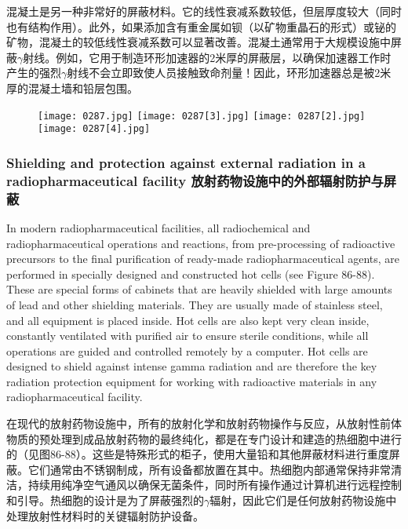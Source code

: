 \documentclass[dvipsnames, svgnames,a4paper,11pt]{article}
\begin{document}
混凝土是另一种非常好的屏蔽材料。它的线性衰减系数较低，但层厚度较大（同时也有结构作用）。此外，如果添加含有重金属如钡（以矿物重晶石的形式）或铋的矿物，混凝土的较低线性衰减系数可以显著改善。混凝土通常用于大规模设施中屏蔽$\gamma$射线。例如，它用于制造环形加速器的2米厚的屏蔽层，以确保加速器工作时产生的强烈$\gamma$射线不会立即致使人员接触致命剂量！因此，环形加速器总是被2米厚的混凝土墙和铅层包围。

\begin{figure}[h]
    \centering
    \texttt{[image: 0287.jpg]} \hspace{0.2in}
    \texttt{[image: 0287[3].jpg]}  \hspace{0.2in}
    \texttt{[image: 0287[2].jpg]} \hspace{0.2in}
    \texttt{[image: 0287[4].jpg]}  
     \label{fig381}
\end{figure}


\subsubsection{Shielding and protection against external radiation in a radiopharmaceutical facility 放射药物设施中的外部辐射防护与屏蔽}

In modern radiopharmaceutical facilities, all radiochemical and radiopharmaceutical operations and reactions, from pre-processing of radioactive precursors to the final purification of ready-made radiopharmaceutical agents, are performed in specially designed and constructed hot cells (see Figure 86-88). These are special forms of cabinets that are heavily shielded with large amounts of lead and other shielding materials. They are usually made of stainless steel, and all equipment is placed inside. Hot cells are also kept very clean inside, constantly ventilated with purified air to ensure sterile conditions, while all operations are guided and controlled remotely by a computer. Hot cells are designed to shield against intense gamma radiation and are therefore the key radiation protection equipment for working with radioactive materials in any radiopharmaceutical facility.

在现代的放射药物设施中，所有的放射化学和放射药物操作与反应，从放射性前体物质的预处理到成品放射药物的最终纯化，都是在专门设计和建造的热细胞中进行的（见图86-88）。这些是特殊形式的柜子，使用大量铅和其他屏蔽材料进行重度屏蔽。它们通常由不锈钢制成，所有设备都放置在其中。热细胞内部通常保持非常清洁，持续用纯净空气通风以确保无菌条件，同时所有操作通过计算机进行远程控制和引导。热细胞的设计是为了屏蔽强烈的$\gamma$辐射，因此它们是任何放射药物设施中处理放射性材料时的关键辐射防护设备。
\end{document}
